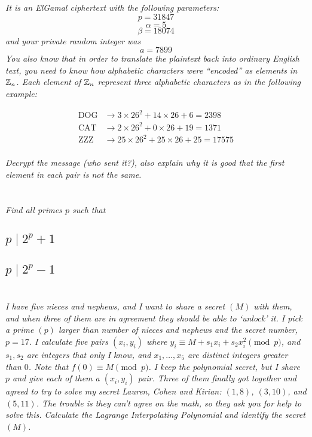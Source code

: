 \documentclass[12pt]{article}
\begin{document}
\textit{It is an ElGamal ciphertext with the following parameters:}
    $$p = 31847$$
    $$\alpha = 5$$
    $$\beta = 18074$$
\textit{and your private random integer was}
    $$a = 7899$$
\textit{You also know that in order to translate the plaintext back into ordinary English text, you need to know how alphabetic characters were ``encoded'' as elements in $\mathbb{Z}_n$.  Each element of $\mathbb{Z}_n$ represent three alphabetic characters as in the following example:}

    \begin{align*}
        \text{DOG} &\to 3  \times 26^2 + 14 \times 26 + 6  = 2398\\
        \text{CAT} &\to 2  \times 26^2 + 0  \times 26 + 19 = 1371\\
        \text{ZZZ} &\to 25 \times 26^2 + 25 \times 26 + 25 = 17575\\
    \end{align*}

\textit{Decrypt the message (who sent it?), also explain why it is good that the first element in each pair is not the same.}

\newpage

\section{} \textit{Find all primes $p$ such that}

    \subsection{$p \mid 2^p + 1$}

    \subsection{$p \mid 2^p - 1$}

\newpage

\section{} \textit{I have five nieces and nephews, and I want to share a secret $(M)$ with them, and when three of them are in agreement they should be able to `unlock' it. I pick a prime $(p)$ larger than number of nieces and nephews and the secret number, $p = 17$. I calculate five pairs $(x_i, y_i)$ where $y_i \equiv M + s_1 x_i + s_2 x_i ^ 2\pmod{p}$, and $s_1, s_2$ are integers that only I know, and $x_1, \dots, x_5$ are distinct integers greater than $0$. Note that $f(0) \equiv M \pmod{p}$. I keep the polynomial secret, but I share $p$ and give each of them a $(x_i, y_i)$ pair. Three of them finally got together and agreed to try to solve my secret Lauren, Cohen and Kirian: $(1, 8)$, $(3, 10)$, and $(5, 11)$. The trouble is they can't agree on the math, so they ask you for help to solve this. Calculate the Lagrange Interpolating Polynomial and identify the secret $(M)$.}
\end{document}
